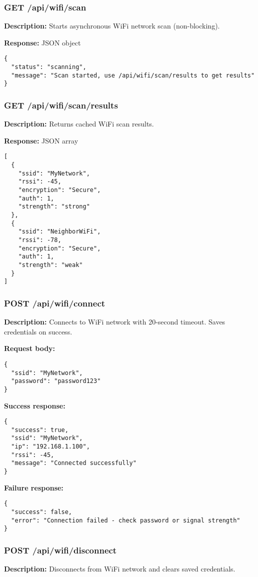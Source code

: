 \documentclass[11pt,a4paper]{article}
\begin{document}
\subsubsection{GET /api/wifi/scan}
\textbf{Description:} Starts asynchronous WiFi network scan (non-blocking).

\textbf{Response:} JSON object
\begin{verbatim}
{
  "status": "scanning",
  "message": "Scan started, use /api/wifi/scan/results to get results"
}
\end{verbatim}

\subsubsection{GET /api/wifi/scan/results}
\textbf{Description:} Returns cached WiFi scan results.

\textbf{Response:} JSON array
\begin{verbatim}
[
  {
    "ssid": "MyNetwork",
    "rssi": -45,
    "encryption": "Secure",
    "auth": 1,
    "strength": "strong"
  },
  {
    "ssid": "NeighborWiFi",
    "rssi": -78,
    "encryption": "Secure",
    "auth": 1,
    "strength": "weak"
  }
]
\end{verbatim}

\subsubsection{POST /api/wifi/connect}
\textbf{Description:} Connects to WiFi network with 20-second timeout. Saves credentials on success.

\textbf{Request body:}
\begin{verbatim}
{
  "ssid": "MyNetwork",
  "password": "password123"
}
\end{verbatim}

\textbf{Success response:}
\begin{verbatim}
{
  "success": true,
  "ssid": "MyNetwork",
  "ip": "192.168.1.100",
  "rssi": -45,
  "message": "Connected successfully"
}
\end{verbatim}

\textbf{Failure response:}
\begin{verbatim}
{
  "success": false,
  "error": "Connection failed - check password or signal strength"
}
\end{verbatim}

\subsubsection{POST /api/wifi/disconnect}
\textbf{Description:} Disconnects from WiFi network and clears saved credentials.
\end{document}
